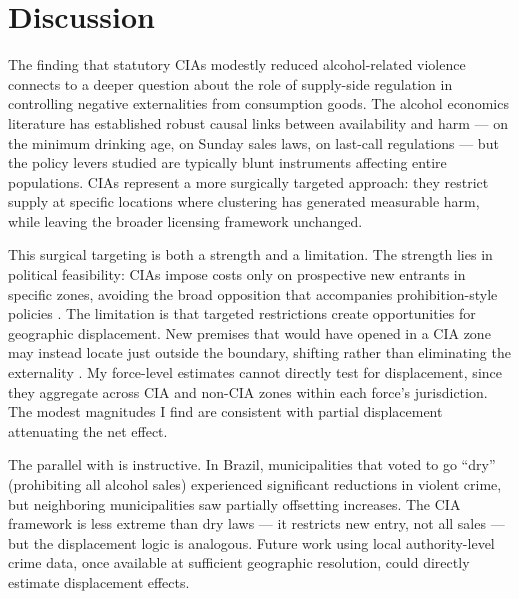 \documentclass[12pt]{article}
\begin{document}
\section{Discussion}
\label{sec:discussion}

The finding that statutory CIAs modestly reduced alcohol-related violence connects to a deeper question about the role of supply-side regulation in controlling negative externalities from consumption goods. The alcohol economics literature has established robust causal links between availability and harm --- \citet{carpenter2009effect} on the minimum drinking age, \citet{heaton2012sunday} on Sunday sales laws, \citet{marcus2016role} on last-call regulations --- but the policy levers studied are typically blunt instruments affecting entire populations. CIAs represent a more surgically targeted approach: they restrict supply at specific locations where clustering has generated measurable harm, while leaving the broader licensing framework unchanged.

This surgical targeting is both a strength and a limitation. The strength lies in political feasibility: CIAs impose costs only on prospective new entrants in specific zones, avoiding the broad opposition that accompanies prohibition-style policies \citep{cook2007paying}. The limitation is that targeted restrictions create opportunities for geographic displacement. New premises that would have opened in a CIA zone may instead locate just outside the boundary, shifting rather than eliminating the externality \citep{green2007uk}. My force-level estimates cannot directly test for displacement, since they aggregate across CIA and non-CIA zones within each force's jurisdiction. The modest magnitudes I find are consistent with partial displacement attenuating the net effect.

The parallel with \citet{biderman2010dry} is instructive. In Brazil, municipalities that voted to go ``dry'' (prohibiting all alcohol sales) experienced significant reductions in violent crime, but neighboring municipalities saw partially offsetting increases. The CIA framework is less extreme than dry laws --- it restricts new entry, not all sales --- but the displacement logic is analogous. Future work using local authority-level crime data, once available at sufficient geographic resolution, could directly estimate displacement effects.
\end{document}
